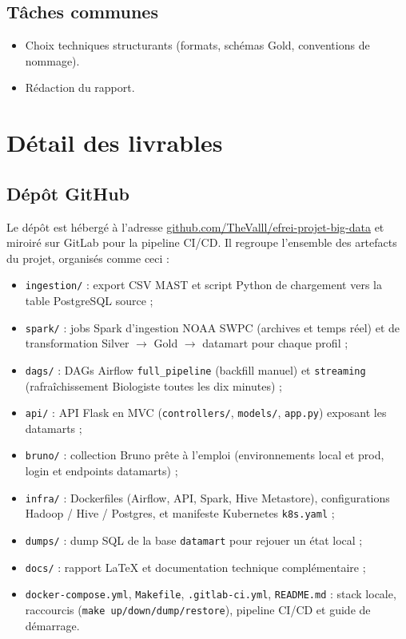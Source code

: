 \documentclass[11pt,a4paper]{article}
\begin{document}
\subsection{Tâches communes}

\begin{itemize}
    \item Choix techniques structurants (formats, schémas Gold, conventions de nommage).
    \item Rédaction du rapport.
\end{itemize}

\newpage
\section{Détail des livrables}

\subsection{Dépôt GitHub}

Le dépôt est hébergé à l'adresse \href{https://github.com/TheValll/efrei-projet-big-data}{github.com/TheValll/efrei-projet-big-data} et miroiré sur GitLab pour la pipeline CI/CD. Il regroupe l'ensemble des artefacts du projet, organisés comme ceci :

\begin{itemize}
    \item \texttt{ingestion/} : export CSV MAST et script Python de chargement vers la table PostgreSQL source ;
    \item \texttt{spark/} : jobs Spark d'ingestion NOAA SWPC (archives et temps réel) et de transformation Silver $\rightarrow$ Gold $\rightarrow$ datamart pour chaque profil ;
    \item \texttt{dags/} : DAGs Airflow \texttt{full\_pipeline} (backfill manuel) et \texttt{streaming} (rafraîchissement Biologiste toutes les dix minutes) ;
    \item \texttt{api/} : API Flask en MVC (\texttt{controllers/}, \texttt{models/}, \texttt{app.py}) exposant les datamarts ;
    \item \texttt{bruno/} : collection Bruno prête à l'emploi (environnements local et prod, login et endpoints datamarts) ;
    \item \texttt{infra/} : Dockerfiles (Airflow, API, Spark, Hive Metastore), configurations Hadoop / Hive / Postgres, et manifeste Kubernetes \texttt{k8s.yaml} ;
    \item \texttt{dumps/} : dump SQL de la base \texttt{datamart} pour rejouer un état local ;
    \item \texttt{docs/} : rapport \LaTeX{} et documentation technique complémentaire ;
    \item \texttt{docker-compose.yml}, \texttt{Makefile}, \texttt{.gitlab-ci.yml}, \texttt{README.md} : stack locale, raccourcis (\texttt{make up/down/dump/restore}), pipeline CI/CD et guide de démarrage.
\end{itemize}
\end{document}
